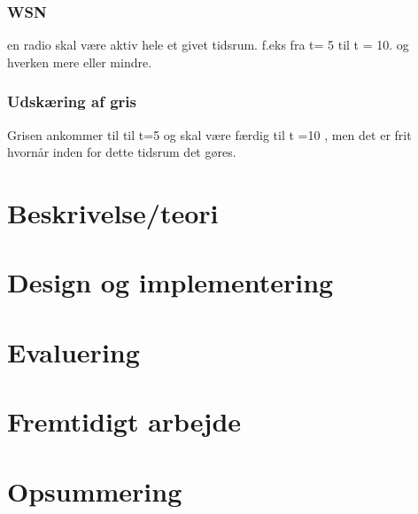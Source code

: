 \subsubsection{WSN}
en radio skal være aktiv hele et givet tidsrum. f.eks fra t= 5 til t = 10. og hverken mere eller mindre.

\subsubsection*{Udskæring af gris}
Grisen ankommer til til t=5 og skal være færdig til t =10 , men det er frit hvornår inden for dette tidsrum det gøres.

  \section{Beskrivelse/teori}
  \section{Design og implementering}
  \section{Evaluering}
  \section{Fremtidigt arbejde}
  \section{Opsummering}
